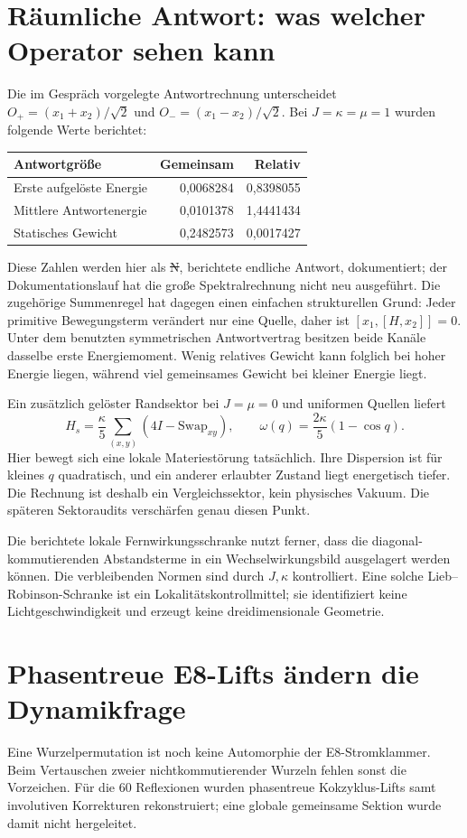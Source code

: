 \section{Räumliche Antwort: was welcher Operator sehen kann}
Die im Gespräch vorgelegte Antwortrechnung unterscheidet $O_+=(x_1+x_2)/\sqrt2$ und $O_-=(x_1-x_2)/\sqrt2$. Bei $J=\kappa=\mu=1$ wurden folgende Werte berichtet:
\begin{center}
\begin{tabular}{@{}lrr@{}}
\toprule
Antwortgröße & Gemeinsam & Relativ\\\midrule
Erste aufgelöste Energie & 0,0068284 & 0,8398055\\
Mittlere Antwortenergie & 0,0101378 & 1,4441434\\
Statisches Gewicht & 0,2482573 & 0,0017427\\\bottomrule
\end{tabular}
\end{center}
Diese Zahlen werden hier als \st{N}, berichtete endliche Antwort, dokumentiert; der Dokumentationslauf hat die große Spektralrechnung nicht neu ausgeführt. Die zugehörige Summenregel hat dagegen einen einfachen strukturellen Grund: Jeder primitive Bewegungsterm verändert nur eine Quelle, daher ist $[x_1,[H,x_2]]=0$. Unter dem benutzten symmetrischen Antwortvertrag besitzen beide Kanäle dasselbe erste Energiemoment. Wenig relatives Gewicht kann folglich bei hoher Energie liegen, während viel gemeinsames Gewicht bei kleiner Energie liegt.

Ein zusätzlich gelöster Randsektor bei $J=\mu=0$ und uniformen Quellen liefert
\[
 H_s=\frac{\kappa}{5}\sum_{(x,y)}(4I-\mathrm{Swap}_{xy}),
 \qquad\omega(q)=\frac{2\kappa}{5}(1-\cos q).
\]
Hier bewegt sich eine lokale Materiestörung tatsächlich. Ihre Dispersion ist für kleines $q$ quadratisch, und ein anderer erlaubter Zustand liegt energetisch tiefer. Die Rechnung ist deshalb ein Vergleichssektor, kein physisches Vakuum. Die späteren Sektoraudits verschärfen genau diesen Punkt. 

Die berichtete lokale Fernwirkungsschranke nutzt ferner, dass die diagonal-kommutierenden Abstandsterme in ein Wechselwirkungsbild ausgelagert werden können. Die verbleibenden Normen sind durch $J,\kappa$ kontrolliert. Eine solche Lieb--Robinson-Schranke ist ein Lokalitätskontrollmittel; sie identifiziert keine Lichtgeschwindigkeit und erzeugt keine dreidimensionale Geometrie.

\section{Phasentreue E8-Lifts ändern die Dynamikfrage}
Eine Wurzelpermutation ist noch keine Automorphie der E8-Stromklammer. Beim Vertauschen zweier nichtkommutierender Wurzeln fehlen sonst die Vorzeichen. Für die 60 Reflexionen wurden phasentreue Kokzyklus-Lifts samt involutiven Korrekturen rekonstruiert; eine globale gemeinsame Sektion wurde damit nicht hergeleitet. 

